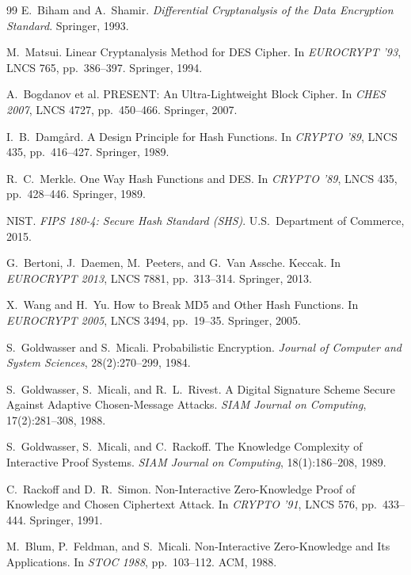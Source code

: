 ﻿\documentclass[a4paper,12pt]{scrreprt}
\theoremstyle{definition}
\begin{document}
\begin{thebibliography}{99}
E.\ Biham and A.\ Shamir. \textit{Differential Cryptanalysis of the Data Encryption Standard}. Springer, 1993.

M.\ Matsui. Linear Cryptanalysis Method for DES Cipher. In \textit{EUROCRYPT '93}, LNCS 765, pp.\ 386--397. Springer, 1994.

A.\ Bogdanov et al. PRESENT: An Ultra-Lightweight Block Cipher. In \textit{CHES 2007}, LNCS 4727, pp.\ 450--466. Springer, 2007.

I.\ B.\ Damg{\aa}rd. A Design Principle for Hash Functions. In \textit{CRYPTO '89}, LNCS 435, pp.\ 416--427. Springer, 1989.

R.\ C.\ Merkle. One Way Hash Functions and DES. In \textit{CRYPTO '89}, LNCS 435, pp.\ 428--446. Springer, 1989.

NIST. \textit{FIPS 180-4: Secure Hash Standard (SHS)}. U.S.\ Department of Commerce, 2015.

G.\ Bertoni, J.\ Daemen, M.\ Peeters, and G.\ Van Assche. Keccak. In \textit{EUROCRYPT 2013}, LNCS 7881, pp.\ 313--314. Springer, 2013.

X.\ Wang and H.\ Yu. How to Break MD5 and Other Hash Functions. In \textit{EUROCRYPT 2005}, LNCS 3494, pp.\ 19--35. Springer, 2005.

S.\ Goldwasser and S.\ Micali. Probabilistic Encryption. \textit{Journal of Computer and System Sciences}, 28(2):270--299, 1984.

S.\ Goldwasser, S.\ Micali, and R.\ L.\ Rivest. A Digital Signature Scheme Secure Against Adaptive Chosen-Message Attacks. \textit{SIAM Journal on Computing}, 17(2):281--308, 1988.

S.\ Goldwasser, S.\ Micali, and C.\ Rackoff. The Knowledge Complexity of Interactive Proof Systems. \textit{SIAM Journal on Computing}, 18(1):186--208, 1989.

C.\ Rackoff and D.\ R.\ Simon. Non-Interactive Zero-Knowledge Proof of Knowledge and Chosen Ciphertext Attack. In \textit{CRYPTO '91}, LNCS 576, pp.\ 433--444. Springer, 1991.

M.\ Blum, P.\ Feldman, and S.\ Micali. Non-Interactive Zero-Knowledge and Its Applications. In \textit{STOC 1988}, pp.\ 103--112. ACM, 1988.


\end{thebibliography}
\end{document}

